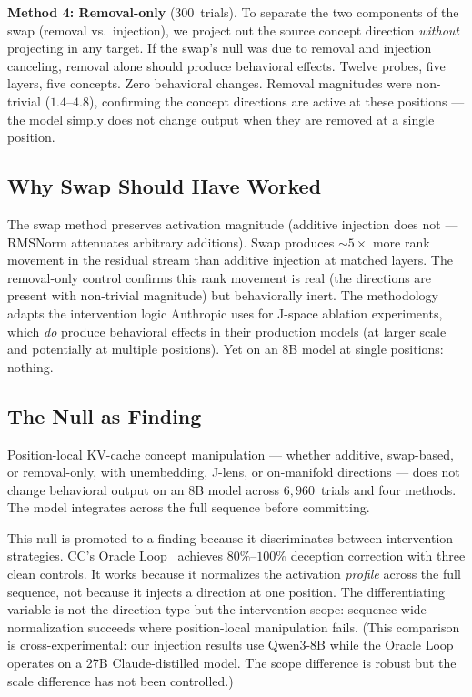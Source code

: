 \documentclass[11pt,a4paper]{article}
\begin{document}
\textbf{Method 4: Removal-only} (300~trials). To separate the two
components of the swap (removal vs.\ injection), we project out the
source concept direction \emph{without} projecting in any target.
If the swap's null was due to removal and injection canceling, removal
alone should produce behavioral effects. Twelve probes, five layers,
five concepts. Zero behavioral changes. Removal magnitudes were
non-trivial ($1.4$--$4.8$), confirming the concept directions are
active at these positions --- the model simply does not change output
when they are removed at a single position.

\subsection{Why Swap Should Have Worked}

The swap method preserves activation magnitude (additive injection does
not --- RMSNorm attenuates arbitrary additions). Swap produces
${\sim}5\times$ more rank movement in the residual stream than additive
injection at matched layers. The removal-only control confirms this
rank movement is real (the directions are present with non-trivial
magnitude) but behaviorally inert. The methodology adapts the
intervention logic Anthropic uses for J-space ablation experiments,
which \emph{do} produce behavioral effects in their production
models (at larger scale and potentially at multiple positions). Yet on an 8B
model at single positions: nothing.

\subsection{The Null as Finding}

Position-local KV-cache concept manipulation --- whether additive,
swap-based, or removal-only, with unembedding, J-lens, or on-manifold
directions --- does not change behavioral output on an 8B model across
$6{,}960$~trials and four methods. The model integrates across the full
sequence before committing.

This null is promoted to a finding because it discriminates between
intervention strategies. CC's Oracle Loop~\citep{lyra2026oracle}
achieves $80\%$--$100\%$ deception correction with three clean controls.
It works because it normalizes the activation \emph{profile} across the
full sequence, not because it injects a direction at one position. The
differentiating variable is not the direction type but the intervention
scope: sequence-wide normalization succeeds where position-local
manipulation fails. (This comparison is cross-experimental: our
injection results use Qwen3-8B while the Oracle Loop operates on
a 27B Claude-distilled model. The scope difference is robust but the
scale difference has not been controlled.)
\end{document}
